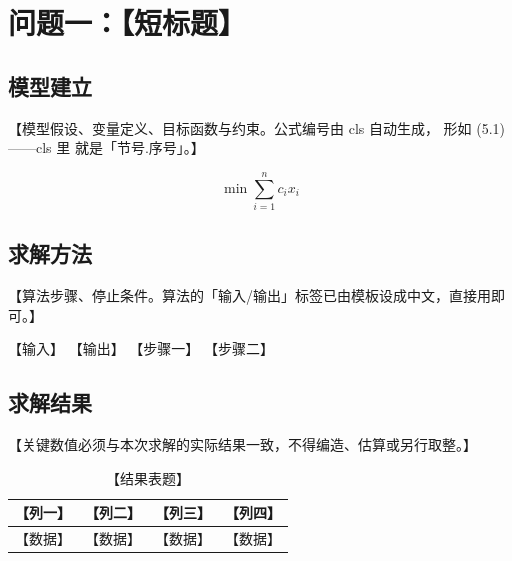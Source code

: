 \section{问题一：【短标题】}

\subsection{模型建立}

【模型假设、变量定义、目标函数与约束。公式编号由 cls 自动生成，
形如 (5.1)——cls 里 \theequation 就是「节号.序号」。】

\begin{equation}
  \label{eq:p1_obj}
  \min \sum_{i=1}^{n} c_i x_i
\end{equation}

\subsection{求解方法}

【算法步骤、停止条件。算法的「输入/输出」标签已由模板设成中文，直接用即可。】

\begin{algorithm}[H]
  \caption{【算法名】}
  \begin{algorithmic}[1]
    \Require 【输入】
    \Ensure  【输出】
    \State 【步骤一】
    \State 【步骤二】
  \end{algorithmic}
\end{algorithm}

\subsection{求解结果}

【关键数值必须与本次求解的实际结果一致，不得编造、估算或另行取整。】

\begin{table}[H]
  \centering
  \caption{【结果表题】}
  \label{tab:p1_result}
  \begin{tabular}{cccc}
    \toprule
    【列一】 & 【列二】 & 【列三】 & 【列四】 \\
    \midrule
    【数据】 & 【数据】 & 【数据】 & 【数据】 \\
    \bottomrule
  \end{tabular}
\end{table}

